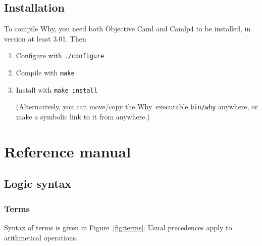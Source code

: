 \documentclass[a4paper,12pt]{report}
\newcommand{\why}{\textsf{Why}}
\begin{document}
\section{Installation}

To compile \why, you need both \textsf{Objective Caml} and
\textsf{Camlp4} to be installed, in version at least 3.01.
Then 

\begin{enumerate}
\item Configure with \texttt{./configure}

  

\item Compile with \texttt{make}

\item Install with \texttt{make install}

  (Alternatively, you can move/copy the \why\ executable
  \texttt{bin/why} anywhere, or make a symbolic link to it from anywhere.)
\end{enumerate}


\chapter{Reference manual}
\label{syntax}

\section{Logic syntax}

\subsection{Terms}

Syntax of terms is given in Figure~\ref{fig:terms}.
Usual precedences apply to arithmetical operations.
\end{document}
